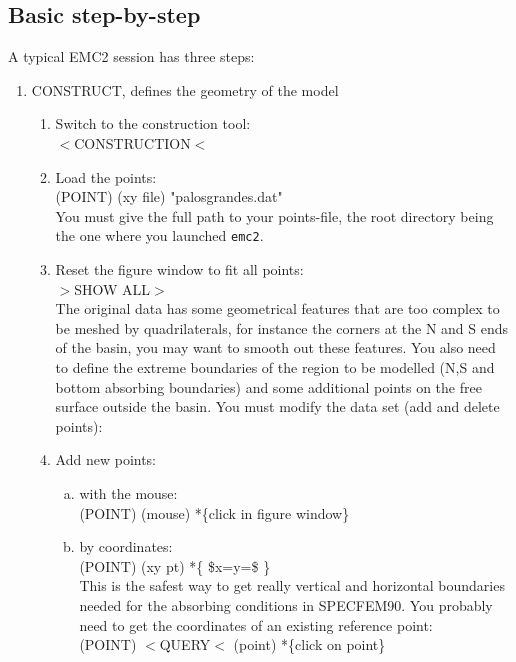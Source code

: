 \subsection{Basic step-by-step}

A typical EMC2 session has three steps:

\begin{enumerate}[STEP I:]
\item CONSTRUCT\label{cons}, defines the geometry of the model

\begin{enumerate}[1.]
\item Switch to the construction tool:\\
      \textsf{$<$CONSTRUCTION$<$}
\item Load the points:\\
      \textsf{(POINT) (xy file) "palosgrandes.dat"}\\
   You must give the full path to your points-file,
   the root directory being the one where you launched \texttt{emc2}.
   \label{loadpoints} 

\item Reset the figure window to fit all points: \\
	\textsf{$>$SHOW ALL$>$}\\

The original data has some geometrical features 
that are too complex to be meshed by quadrilaterals, for instance
the corners at the N and S ends of the basin, you may
want to smooth out these features. 
You also need to define the extreme 
boundaries of the region to be modelled (N,S and bottom
absorbing boundaries) and some additional points on
the free surface outside the basin.
You must modify the data set (add and delete points):

\item Add new points:

  \begin{enumerate}[a.]
  \item with the mouse:\\
	\textsf{(POINT) (mouse) *\{click in figure window\}}

  \item by coordinates:\\
	\textsf{(POINT) (xy pt) *\{ \$x=y=\$ \}}\\
     This is the safest way to get really vertical and
     horizontal boundaries needed for the absorbing conditions
     in SPECFEM90. You probably need to get
     the coordinates of an existing reference point:\\
        \textsf{(POINT) $<$QUERY$<$ (point) *\{click on point\}}


\end{enumerate}
\end{enumerate}
\end{enumerate}
